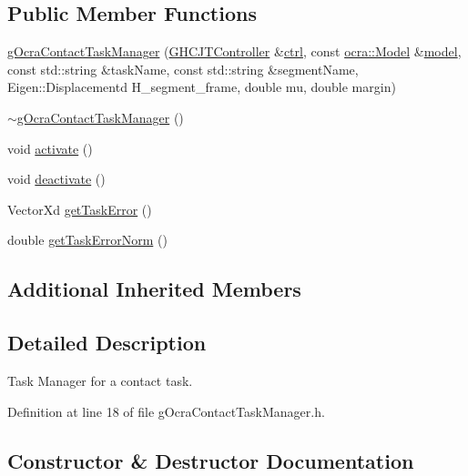 \subsection*{Public Member Functions}
\begin{DoxyCompactItemize}
\item 
\hyperlink{classgocra_1_1gOcraContactTaskManager_aa35eda0ee0b427b7da1aca284f6da5a8}{g\+Ocra\+Contact\+Task\+Manager} (\hyperlink{classgocra_1_1GHCJTController}{G\+H\+C\+J\+T\+Controller} \&\hyperlink{classgocra_1_1gOcraTaskManagerBase_a52d76d9b54d92f3d31faeaafda99e4c7}{ctrl}, const \hyperlink{classocra_1_1Model}{ocra\+::\+Model} \&\hyperlink{classgocra_1_1gOcraTaskManagerBase_adc439e7170f7120611fc6d009d06404e}{model}, const std\+::string \&task\+Name, const std\+::string \&segment\+Name, Eigen\+::\+Displacementd H\+\_\+segment\+\_\+frame, double mu, double margin)
\item 
\hyperlink{classgocra_1_1gOcraContactTaskManager_a196591b3cc42be1aafcaa134c9f21200}{$\sim$g\+Ocra\+Contact\+Task\+Manager} ()
\item 
void \hyperlink{classgocra_1_1gOcraContactTaskManager_a51eef1bcdf87285b5b731356c6b46727}{activate} ()
\item 
void \hyperlink{classgocra_1_1gOcraContactTaskManager_adf02de85b4a661c70cd7e2031c1b7500}{deactivate} ()
\item 
Vector\+Xd \hyperlink{classgocra_1_1gOcraContactTaskManager_a50ef70ceb95ced6818a5990fa6615d6a}{get\+Task\+Error} ()
\item 
double \hyperlink{classgocra_1_1gOcraContactTaskManager_af7865eaf5c86bca10e8911a23cceaf2a}{get\+Task\+Error\+Norm} ()
\end{DoxyCompactItemize}
\subsection*{Additional Inherited Members}


\subsection{Detailed Description}
Task Manager for a contact task. 



Definition at line 18 of file g\+Ocra\+Contact\+Task\+Manager.\+h.



\subsection{Constructor \& Destructor Documentation}
\hypertarget{classgocra_1_1gOcraContactTaskManager_aa35eda0ee0b427b7da1aca284f6da5a8}{}\label{classgocra_1_1gOcraContactTaskManager_aa35eda0ee0b427b7da1aca284f6da5a8} 
